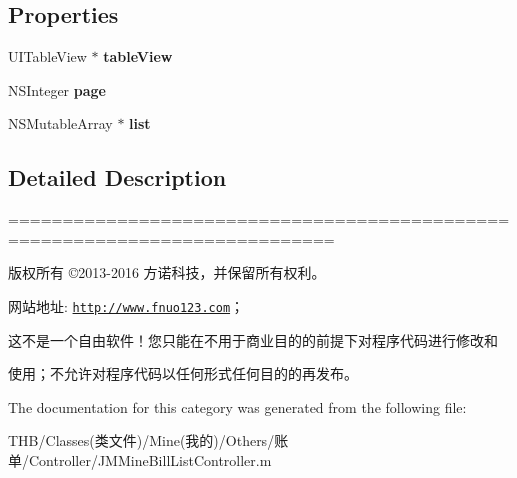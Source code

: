 \subsection*{Properties}
\begin{DoxyCompactItemize}
\item 
\mbox{\label{category_j_m_mine_bill_list_controller_07_08_a529e6a5552dfed854a8a75371f319912}} 
U\+I\+Table\+View $\ast$ {\bfseries table\+View}
\item 
\mbox{\label{category_j_m_mine_bill_list_controller_07_08_aa0426437f39231b275cee6306f7f625c}} 
N\+S\+Integer {\bfseries page}
\item 
\mbox{\label{category_j_m_mine_bill_list_controller_07_08_a8c857353d898642f72b3bd431948d455}} 
N\+S\+Mutable\+Array $\ast$ {\bfseries list}
\end{DoxyCompactItemize}


\subsection{Detailed Description}
============================================================================

版权所有 ©2013-\/2016 方诺科技，并保留所有权利。

网站地址\+: \href{http://www.fnuo123.com}{\tt http\+://www.\+fnuo123.\+com}； 



这不是一个自由软件！您只能在不用于商业目的的前提下对程序代码进行修改和

使用；不允许对程序代码以任何形式任何目的的再发布。 

 

The documentation for this category was generated from the following file\+:\begin{DoxyCompactItemize}
\item 
T\+H\+B/\+Classes(类文件)/\+Mine(我的)/\+Others/账单/\+Controller/J\+M\+Mine\+Bill\+List\+Controller.\+m\end{DoxyCompactItemize}
